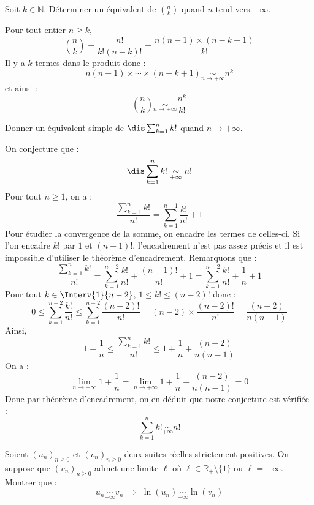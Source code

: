 \documentclass[a4paper,10pt]{report}
\begin{document}
\medskip


\begin{Exa} Soit $k \in \mathbb{N}$. Déterminer un équivalent de $\binom{n}{k}$ quand $n$ tend vers $+ \infty$. 
\end{Exa}

\corr Pour tout entier $n \geq k$,
$$ \binom{n}{k} = \dfrac{n!}{k!(n-k)!} = \dfrac{n(n-1)\times (n-k+1)}{k!}$$
Il y a $k$ termes dans le produit donc :
$$ n(n-1)\times \cdots \times (n-k+1) \underset{n \rightarrow + \infty}{\sim} n^k$$
et ainsi :
$$  \binom{n}{k} \underset{n \rightarrow+ \infty}{\sim} \dfrac{n^k}{k!}$$

\medskip

\begin{Exa}[\ding{80}] Donner un équivalent simple de $\dis \sum_{k=1}^n k!$ quand $n \rightarrow + \infty$.
\end{Exa} 

\corr On conjecture que :
$$ \dis \sum_{k=1}^n k! \underset{+ \infty}{\sim} n! $$
Pour tout $n \geq 1$, on a :
$$\dfrac{\sum_{k=1}^n k!}{n!}  = \sum_{k=1}^{n-1} \dfrac{k!}{n!} + 1 $$
Pour étudier la convergence de la somme, on encadre les termes de celles-ci. Si l'on encadre $k!$ par $1$ et $(n-1)!$, l'encadrement n'est pas assez précis et il est impossible d'utiliser le théorème d'encadrement. Remarquons que :
$$ \dfrac{\sum_{k=1}^n k!}{n!}  = \sum_{k=1}^{n-2} \dfrac{k!}{n!} + \dfrac{(n-1)!}{n!} + 1 = \sum_{k=1}^{n-2} \dfrac{k!}{n!} + \dfrac{1}{n} + 1 $$
Pour tout $k \in \Interv{1}{n-2}$, $1 \leq k! \leq (n-2)!$ donc :
$$ 0 \leq \sum_{k=1}^{n-2} \dfrac{k!}{n!} \leq \sum_{k=1}^{n-2} \dfrac{(n-2)!}{n!} = (n-2) \times \dfrac{(n-2)!}{n!} = \dfrac{(n-2)}{n(n-1)}$$
Ainsi,
$$ 1+ \dfrac{1}{n} \leq \dfrac{\sum_{k=1}^n k!}{n!} \leq 1 + \dfrac{1}{n} + \dfrac{(n-2)}{n(n-1)}$$
On a :
$$ \lim_{n \rightarrow + \infty} 1+ \dfrac{1}{n} =  \lim_{n \rightarrow + \infty} 1+ \dfrac{1}{n} + \dfrac{(n-2)}{n(n-1)} = 0$$
Donc par théorème d'encadrement, on en déduit que notre conjecture est vérifiée :
$$ \sum_{k=1}^n k! \underset{+ \infty}{\sim} n! $$

\medskip


\begin{Exa}\label{log} Soient $(u_n)_{n \geq 0}$ et $(v_n)_{n \geq 0}$ deux suites réelles strictement positives. On suppose que $(v_n)_{n \geq 0}$ admet une limite $\ell$ où $\ell \in \mathbb{R}_+\setminus \lbrace 1 \rbrace$ ou $\ell= + \infty$. Montrer que :
$$ u_n \underset{+ \infty}{\sim} v_n \; \Longrightarrow  \; \ln(u_n) \underset{+ \infty}{\sim} \ln(v_n)$$
\end{Exa}
\end{document}
